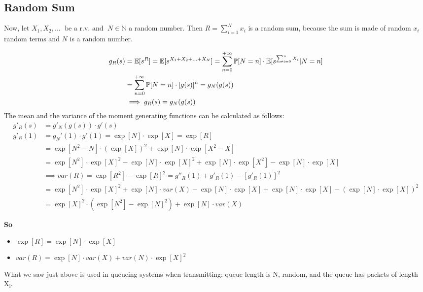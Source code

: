 \subsection{Random Sum}
Now, let $X_1, X_2, \dotsc \; \text{ be a r.v. and }\; N \in \mathbb{N}$ a random number. Then $R=\sum\limits_{i=1}^{N}x_i$
is a random sum, because the sum is made of random $x_i$ random terms and $N$ is a random number.

\begin{equation}
  \begin{split}
    g_R(s)&=\mathbb{E}[s^R]=\mathbb{E}[s^{X_1+X_2+\dotsc+X_N}]=\sum\limits_{n=0}^{+\infty} \mathbb{P}[N=n]\cdot \mathbb{E}[s^{\sum_{i=0}^{n}X_i}|N=n]\\
    &=\sum\limits_{n=0}^{+\infty} \mathbb{P}[N=n]\cdot [g(s)]^n=g_N(g(s))
    \\ & \implies g_R(s) = g_N(g(s))
  \end{split}
\end{equation}
The mean and the variance of the moment generating functions can be calculated as follows:
\begin{equation}\begin{split}
  g'_R(s) &= g'_N(g(s)) \cdot g'(s) \\
  g'_R(1) &= g_N'(1)\cdot g'(1) = \exp[N]\cdot \exp[X]=\exp[R]\\
  &=\exp[N^2-N]\cdot (\exp[X])^2 + \exp[N]\cdot \exp[X^2-X] \\
  &=\exp[N^2]\cdot \exp[X]^2 - \exp[N] \cdot \exp[X]^2 +\exp[N]\cdot \exp[X^2] - \exp[N]\cdot \exp[X]\\
  & \implies var(R) = \exp[R^2]-\exp[R]^2 = g''_R(1)+g'_R(1)-[g'_R(1)]^2\\
  &=\exp[N^2] \cdot \exp[X]^2 + \exp[N] \cdot var(X) - \exp[N]\cdot \exp[X] + \exp[N] \cdot \exp[X] - (\exp[N] \cdot \exp[X])^2 \\
  &= \exp[X]^2 \cdot (\exp[N^2]-\exp[N]^2) + \exp[N] \cdot var(X)
\end{split}
\end{equation}

\textbf{So}
\begin{itemize}
  \item $\exp[R] = \exp[N] \cdot \exp[X]$
  \item $var(R) = \exp[N] \cdot var(X) + var(N) \cdot \exp[X]^2$
\end{itemize}

What we saw just above is used in queueing systems when transmitting: queue length is N, random,
and the queue has packets of length X\textsubscript{i}.

